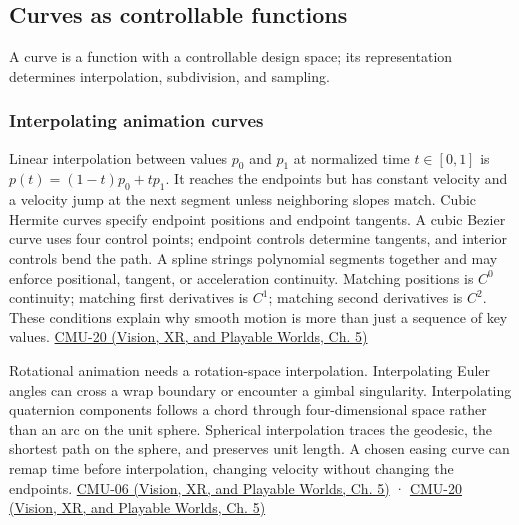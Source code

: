 \subsection{Curves as controllable functions}\label{03-visual-computing-i-ch001-curves-as-controllable-functions}

\hypertarget{03-visual-computing-i-ch001-curves-as-controllable-functions}{}

A curve is a function with a controllable design space; its representation determines interpolation, subdivision, and sampling.

\subsubsection{Interpolating animation curves}\label{03-visual-computing-i-ch001-interpolating-animation-curves}

\hypertarget{03-visual-computing-i-ch001-interpolating-animation-curves}{}

Linear interpolation between values \(p_0\) and \(p_1\) at normalized time \(t\in[0,1]\) is \(p(t)=(1-t)p_0+tp_1\). It reaches the endpoints but has constant velocity and a velocity jump at the next segment unless neighboring slopes match. Cubic Hermite curves specify endpoint positions and endpoint tangents. A cubic Bezier curve uses four control points; endpoint controls determine tangents, and interior controls bend the path. A spline strings polynomial segments together and may enforce positional, tangent, or acceleration continuity. Matching positions is \(C^0\) continuity; matching first derivatives is \(C^1\); matching second derivatives is \(C^2\). These conditions explain why smooth motion is more than just a sequence of key values. \href{../07-Vision-XR-and-Playable-Worlds/main.pdf\#nameddest=04-visual-computing-ii-ch036-cmu-20---introduction-to-animation}{CMU-20 (Vision, XR, and Playable Worlds, Ch. 5)}

Rotational animation needs a rotation-space interpolation. Interpolating Euler angles can cross a wrap boundary or encounter a gimbal singularity. Interpolating quaternion components follows a chord through four-dimensional space rather than an arc on the unit sphere. Spherical interpolation traces the geodesic, the shortest path on the sphere, and preserves unit length. A chosen easing curve can remap time before interpolation, changing velocity without changing the endpoints. \href{../07-Vision-XR-and-Playable-Worlds/main.pdf\#nameddest=04-visual-computing-ii-ch036-cmu-06---3d-rotations-and-complex-representations}{CMU-06 (Vision, XR, and Playable Worlds, Ch. 5)} · \href{../07-Vision-XR-and-Playable-Worlds/main.pdf\#nameddest=04-visual-computing-ii-ch036-cmu-20---introduction-to-animation}{CMU-20 (Vision, XR, and Playable Worlds, Ch. 5)}

